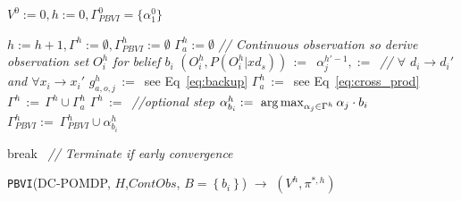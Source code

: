 \documentclass{article} %
\def\argmax{\operatornamewithlimits{arg\max}}
\begin{document}
\begin{algorithm}[t!]
\vspace{-.5mm}
\dontprintsemicolon
{}
\Begin
{
   $V^0:=0, h:=0, \Gamma_{PBVI}^0 = \{ \alpha_1^0 \} $\;
   {
       $h:=h+1, \Gamma^h :=\emptyset, \Gamma_{PBVI}^h :=\emptyset$\;
       {
      	 {
			$\Gamma_{a}^h :=\emptyset$ \;       		
       			{\emph{// Continuous observation so derive observation set $O_i^h$ for belief $b_i$} \;
			  $(O_i^h,P(O_i^h|xd_{s})) \,:=\,$ \;}
       		 {
       			{
   	 		  		$\alpha_j^{h'-1},:=\,$  
   	 		  		\emph{// $\forall$ $d_i \to d_i'$ and $\forall x_i \to x_i'$} \; 
   	 		    	{$g_{a,o,j}^h \,:=\, $ see Eq~\eqref{eq:backup}}
       	      	}
       	     }
            $\Gamma_a^{h} \,:=\, $ see Eq~\eqref{eq:cross_prod}\;
            $\Gamma^{h} \,:=\, \Gamma^{h} \cup \Gamma_a^{h}$\;
       	 }  
              $\Gamma^h \,:=\, $ \emph{//optional step}\; 
      }
      {
     	$\alpha_{b_i}^h :=\ \argmax_{\alpha_j \in \Gamma^h} \alpha_j \cdot b_i$\;
     	$\Gamma_{PBVI}^h :=\ \Gamma_{PBVI}^h \cup \alpha_{b_i}^h$\;
      }

           {break $\,$ \emph{// Terminate if early convergence}\;}
   }
      \;
}
\caption{\footnotesize \texttt{PBVI}(DC-POMDP, $H$,$ContObs$, $B=\left\{b_i \right\}$) $\longrightarrow$ $(V^h,\pi^{*,h})$ \label{alg:vi}}
\vspace{-1mm}
\end{algorithm}
\decmargin{.5em}
\end{document}
